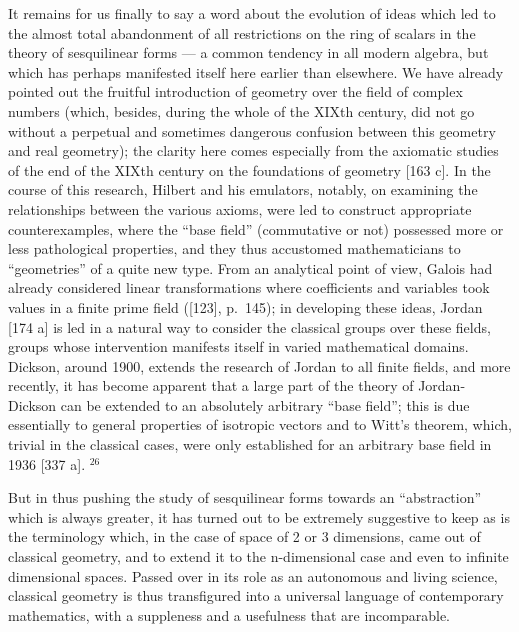 It remains for us finally to say a word about the evolution of ideas which led to the almost total abandonment of all restrictions on the ring of scalars in the theory of sesquilinear forms --- a common tendency in all modern algebra, but which has perhaps manifested itself here earlier than elsewhere. We have already pointed out the fruitful introduction of geometry over the field of complex numbers (which, besides, during the whole of the XIXth century, did not go without a perpetual and sometimes dangerous confusion between this geometry and real geometry); the clarity here comes especially from the axiomatic studies of the end of the XIXth century on the foundations of geometry {[}163 c{]}. In the course of this research, Hilbert and his emulators, notably, on examining the relationships between the various axioms, were led to construct appropriate counterexamples, where the ``base field'' (commutative or not) possessed more or less pathological properties, and they thus accustomed mathematicians to ``geometries'' of a quite new type. From an analytical point of view, Galois had already considered linear transformations where coefficients and variables took values in a finite prime field ({[}123{]}, p.~145); in developing these ideas, Jordan {[}174 a{]} is led in a natural way to consider the classical groups over these fields, groups whose intervention manifests itself in varied mathematical domains. Dickson, around 1900, extends the research of Jordan to all finite fields, and more recently, it has become apparent that a large part of the theory of Jordan-Dickson can be extended to an absolutely arbitrary ``base field''; this is due essentially to general properties of isotropic vectors and to Witt's theorem, which, trivial in the classical cases, were only established for an arbitrary base field in 1936 {[}337 a{]}. \(^{26}\)

But in thus pushing the study of sesquilinear forms towards an ``abstraction'' which is always greater, it has turned out to be extremely suggestive to keep as is the terminology which, in the case of space of 2 or 3 dimensions, came out of classical geometry, and to extend it to the n-dimensional case and even to infinite dimensional spaces. Passed over in its role as an autonomous and living science, classical geometry is thus transfigured into a universal language of contemporary mathematics, with a suppleness and a usefulness that are incomparable.

